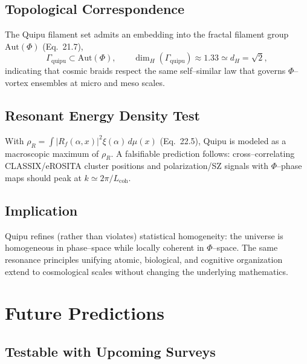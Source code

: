 \subsection{Topological Correspondence}
The Quipu filament set admits an embedding into the fractal filament
group $\mathrm{Aut}(\Phi)$ (Eq.~21.7),
\begin{equation}
\Gamma_{\text{quipu}}\subset \mathrm{Aut}(\Phi),
\qquad
\dim_H(\Gamma_{\text{quipu}})\approx 1.33 \simeq d_H=\sqrt{2},
\end{equation}
indicating that cosmic braids respect the same self--similar law that
governs $\Phi$--vortex ensembles at micro and meso scales.

\subsection{Resonant Energy Density Test}
With $\rho_R = \int |R_f(\alpha,x)|^2 \xi(\alpha)\,d\mu(x)$ (Eq.~22.5),
Quipu is modeled as a macroscopic maximum of $\rho_R$.
A falsifiable prediction follows:
cross--correlating CLASSIX/eROSITA cluster positions and
polarization/SZ signals with $\Phi$--phase maps should peak at
$k \simeq 2\pi/L_{\mathrm{coh}}$.

\subsection{Implication}
Quipu refines (rather than violates) statistical homogeneity:
the universe is homogeneous in phase--space while locally coherent in
$\Phi$--space.  The same resonance principles unifying atomic,
biological, and cognitive organization extend to cosmological scales
without changing the underlying mathematics.

\section{Future Predictions}

\subsection{Testable with Upcoming Surveys}

